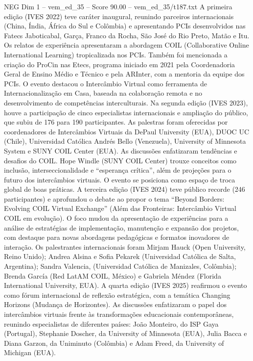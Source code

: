 \begin{textsample}{NEG Dim 1 – vem\_ed\_35 – Score 90.00 – vem\_ed\_35/t187.txt}
A primeira edição (IVES 2022) teve caráter inaugural, reunindo parceiros internacionais (China, Índia, África do Sul e Colômbia) e apresentando PCIs desenvolvidos nas Fatecs Jaboticabal, Garça, Franco da Rocha, São José do Rio Preto, Matão e Itu.
Os relatos de experiência apresentaram a abordagem COIL (Collaborative Online International Learning) tropicalizada nos PCIs.
Também foi mencionada a criação do ProCin nas Etecs, programa iniciado em 2021 pela Coordenadoria Geral de Ensino Médio e Técnico e pela ARInter, com a mentoria da equipe dos PCIs.
O evento destacou o Intercâmbio Virtual como ferramenta de Internacionalização em Casa, baseada na colaboração remota e no desenvolvimento de competências interculturais.
Na segunda edição (IVES 2023), houve a participação de cinco especialistas internacionais e ampliação do público, que subiu de 176 para 190 participantes.
As palestras foram oferecidas por coordenadores de Intercâmbios Virtuais da DePaul University (EUA), DUOC UC (Chile), Universidad Católica Andrés Bello (Venezuela), University of Minnesota System e SUNY COIL Center (EUA).
As discussões enfatizaram tendências e desafios do COIL.
Hope Windle (SUNY COIL Center) trouxe conceitos como inclusão, interseccionalidade e “esperança crítica”, além de projeções para o futuro dos intercâmbios virtuais.
O evento se posiciona como espaço de troca global de boas práticas.
A terceira edição (IVES 2024) teve público recorde (246 participantes) e aprofundou o debate ao propor o tema “Beyond Borders: Evolving COIL Virtual Exchange” (Além das Fronteiras: Intercâmbio Virtual COIL em evolução).
O foco mudou da apresentação de experiências para a análise de estratégias de implementação, manutenção e expansão dos projetos, com destaque para novas abordagens pedagógicas e formatos inovadores de interação.
Os palestrantes internacionais foram Mirjam Hauck (Open University, Reino Unido); Andrea Alsina e Sofia Pekarek (Universidad Católica de Salta, Argentina); Sandra Valencia, (Universidad Católica de Manizales, Colômbia); Brenda García (Red LatAM COIL, México) e Gabriela Méndez (Florida International University, EUA).
A quarta edição (IVES 2025) reafirmou o evento como fórum internacional de reflexão estratégica, com a temática Changing Horizons (Mudança de Horizontes).
As discussões enfatizaram o papel dos intercâmbios virtuais frente às transformações educacionais contemporâneas, reunindo especialistas de diferentes países: João Monteiro, do ISP Gaya (Portugal), Stephanie Doscher, da University of Minnesota (EUA), Julia Bacca e Diana Garzon, da Uniminuto (Colômbia) e Adam Freed, da University of Michigan (EUA).

\end{textsample}
